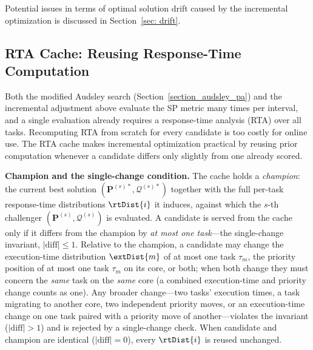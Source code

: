 Potential issues in terms of optimal solution drift caused by the incremental optimization is discussed in Section~\ref{sec: drift}.


	\subsection{RTA Cache: Reusing Response-Time Computation}
	\label{section_rta_cache}

    Both the modified Audsley search (Section~\ref{section_audsley_pa}) and the incremental adjustment above evaluate the SP metric many times per interval, and a single evaluation already requires a response-time analysis (RTA) over all tasks.
    Recomputing RTA from scratch for every candidate is too costly for online use.
    The RTA cache makes incremental optimization practical by reusing prior computation whenever a candidate differs only slightly from one already scored.

    \textbf{Champion and the single-change condition.}
    The cache holds a \emph{champion}: the current best solution $(\boldsymbol{P}^{(s)*},\boldsymbol{\mathcal{Q}}^{(s)*})$ together with the full per-task response-time distributions $\rtDist{i}$ it induces, against which the $s$-th challenger $(\boldsymbol{P}^{(s)},\boldsymbol{\mathcal{Q}}^{(s)})$ is evaluated.
    A candidate is served from the cache only if it differs from the champion by \emph{at most one task}---the single-change invariant, $|\mathrm{diff}| \leq 1$.
    Relative to the champion, a candidate may change the execution-time distribution $\extDist{m}$ of at most one task $\tau_m$, the priority position of at most one task $\tau_m$ on its core, or both; when both change they must concern the \emph{same} task on the \emph{same} core (a combined execution-time and priority change counts as one).
    Any broader change---two tasks' execution times, a task migrating to another core, two independent priority moves, or an execution-time change on one task paired with a priority move of another---violates the invariant ($|\mathrm{diff}| > 1$) and is rejected by a single-change check.
    When candidate and champion are identical ($|\mathrm{diff}| = 0$), every $\rtDist{i}$ is reused unchanged.

